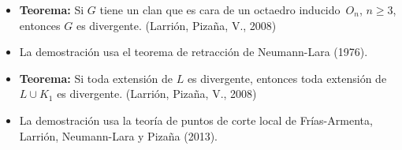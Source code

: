 \documentclass[beamer]{standalone}
\begin{document}
\begin{standaloneframe}
  \begin{itemize}
  \item \textbf{Teorema:} Si $G$ tiene un clan que es cara de un
    octaedro inducido~$O_{n}$, $n\geq3$, entonces $G$ es
    divergente. (Larrión, Pizaña, V., 2008)\pause
  \item La demostración usa el teorema de retracción de Neumann-Lara (1976).\pause
  \item \textbf{Teorema:} Si toda extensión de $L$ es divergente,
    entonces toda extensión de $L\cup K_{1}$ es divergente. (Larrión,
    Pizaña, V., 2008)\pause
  \item La demostración usa la teoría de puntos de corte local de
    Frías-Armenta, Larrión, Neumann-Lara y Pizaña (2013).
  \end{itemize}
\end{standaloneframe}
\end{document}
